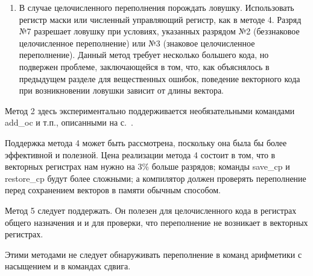 \documentclass[forwardcom.tex]{subfiles}
\begin{document}
\begin{enumerate}
    \item В случае целочисленного переполнения порождать ловушку. Использовать регистр маски или численный управляющий регистр, как в методе 4. Разряд №7 разрешает ловушку при условиях, указанных разрядом №2 (беззнаковое целочисленное переполнение) или №3 (знаковое целочисленное переполнение). Данный метод требует несколько большего кода, но подвержен проблеме, заключающейся в том, что, как объяснялось в предыдущем разделе для вещественных ошибок, поведение векторного кода при возникновении ловушки зависит от длины вектора.
\end{enumerate}

Метод 2 здесь экспериментально поддерживается необязательными командами add\_oc и т.п., описанными на с.~\pageref{instructionsWithOverflowCheck}. 

Поддержка метода 4 может быть рассмотрена, поскольку она была бы более эффективной и полезной. Цена реализации метода 4 состоит в том, что в векторных регистрах нам нужно на 3\% больше разрядов; команды save\_cp и restore\_cp будут более сложными; а компилятор должен проверять переполнение перед сохранением векторов в памяти обычным способом.

Метод 5 следует поддержать. Он полезен для целочисленного кода в регистрах общего назначения и и для проверки, что переполнение не возникает в векторных регистрах.

Этими методами не следует обнаруживать переполнение в команд арифметики с насыщением  и в командах сдвига.
\end{document}
